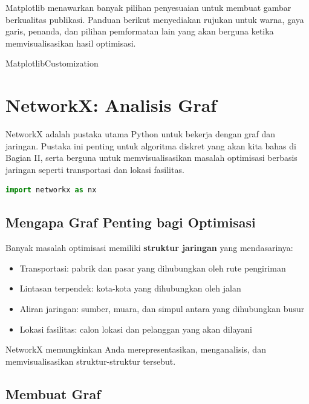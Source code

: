 Matplotlib menawarkan banyak pilihan penyesuaian untuk membuat gambar berkualitas publikasi. Panduan berikut menyediakan rujukan untuk warna, gaya garis, penanda, dan pilihan pemformatan lain yang akan berguna ketika memvisualisasikan hasil optimisasi.

{MatplotlibCustomization}

\section{NetworkX: Analisis Graf}

NetworkX adalah pustaka utama Python untuk bekerja dengan graf dan jaringan. Pustaka ini penting untuk algoritma diskret yang akan kita bahas di Bagian II, serta berguna untuk memvisualisasikan masalah optimisasi berbasis jaringan seperti transportasi dan lokasi fasilitas.

\begin{lstlisting}[language=Python]
import networkx as nx
\end{lstlisting}

\subsection{Mengapa Graf Penting bagi Optimisasi}

Banyak masalah optimisasi memiliki \textbf{struktur jaringan} yang mendasarinya:
\begin{itemize}
\item Transportasi: pabrik dan pasar yang dihubungkan oleh rute pengiriman
\item Lintasan terpendek: kota-kota yang dihubungkan oleh jalan
\item Aliran jaringan: sumber, muara, dan simpul antara yang dihubungkan busur
\item Lokasi fasilitas: calon lokasi dan pelanggan yang akan dilayani
\end{itemize}

NetworkX memungkinkan Anda merepresentasikan, menganalisis, dan memvisualisasikan struktur-struktur tersebut.

\subsection{Membuat Graf}

